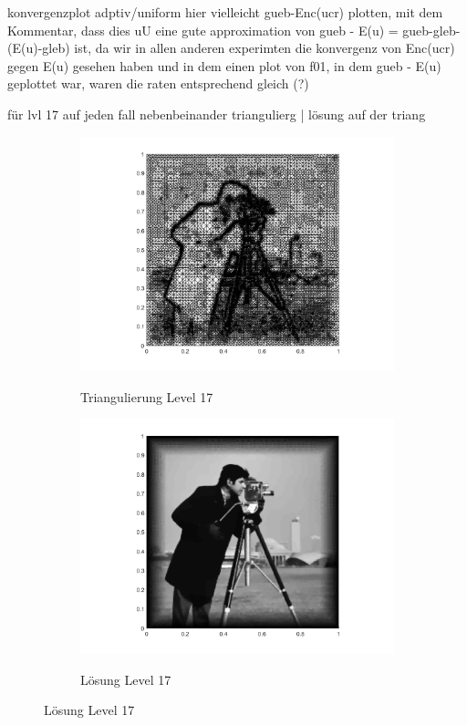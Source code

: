konvergenzplot adptiv/uniform
hier vielleicht gueb-Enc(ucr) plotten, mit dem Kommentar, dass dies uU
eine gute approximation von gueb - E(u) = gueb-gleb-(E(u)-gleb) ist, da 
wir in allen anderen experimten die konvergenz von Enc(ucr) gegen E(u) gesehen
haben und in dem einen plot von f01, in dem gueb - E(u) geplottet war,
 waren die raten entsprechend gleich (?)

für lvl 17 auf jeden fall nebenbeinander triangulierg | lösung auf der triang

\begin{figure}[p]
  \centering
  \begin{subfigure}[b]{.48\linewidth}
    \centering
    \caption{Triangulierung Level 17}
    \includegraphics[trim = 100 30 80 20, clip, width=\linewidth]
      {pictures/chapExperiments/secGrayscale/cam/adaptive/lvl17/triangulation.png}
    \label{fig:camLvl17Triang}
  \end{subfigure}
  \quad
  \begin{subfigure}[b]{.48\linewidth}
    \centering
    \caption{Lösung Level 17}
    \includegraphics[trim = 100 30 80 20, clip, width=\linewidth]
      {pictures/chapExperiments/secGrayscale/cam/adaptive/lvl17/solutionGrayscale.png}
    \label{fig:camLvl17Sol}
  \end{subfigure}


\end{figure}
